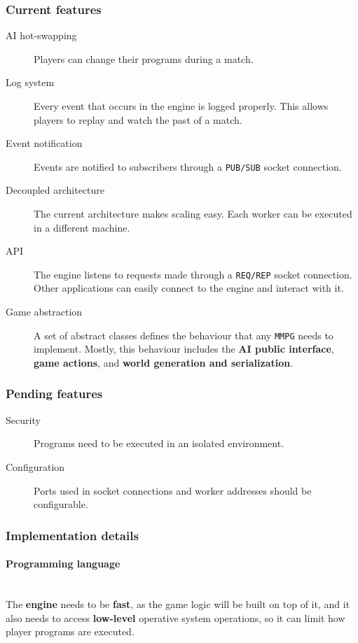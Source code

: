 \documentclass[a4paper,11pt]{article}
\begin{document}
\subsubsection{Current features}
\begin{description}
\item[AI hot-swapping]
Players can change their programs during a match.
\item[Log system]
Every event that occurs in the engine is logged properly. This allows players to replay and
  watch the past of a match.
\item[Event notification]
Events are notified to subscribers through a \texttt{PUB/SUB} socket connection.
\item[Decoupled architecture]
The current architecture makes scaling easy. Each worker can be executed in a
  different machine.
\item[API]
The engine listens to requests made through a \texttt{REQ/REP} socket connection. Other applications can
  easily connect to the engine and interact with it.
\item[Game abstraction]
A set of abstract classes defines the behaviour that any \texttt{MMPG} needs to implement.
  Mostly, this behaviour includes the \textbf{AI public interface}, \textbf{game actions}, and \textbf{world generation and
  serialization}.
\end{description}
\subsubsection{Pending features}
\begin{description}
\item[Security]
Programs need to be executed in an isolated environment.
\item[Configuration]
Ports used in socket connections and worker addresses should be configurable.
\end{description}
\subsubsection{Implementation details}
\paragraph{Programming language}
\hfill
\\[0.2cm]
\indent
The \textbf{engine} needs to be \textbf{fast}, as the game logic will be built on top of it, and it also needs to access
\textbf{low-level} operative system operations, so it can limit how player programs are executed.
\end{document}
